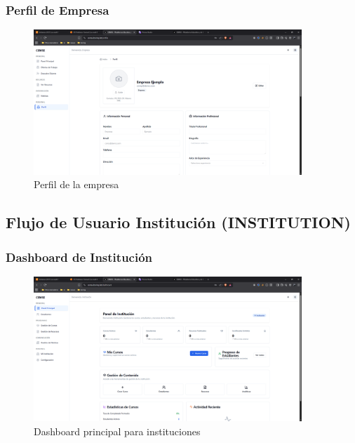 \documentclass[12pt,a4paper]{article}
\begin{document}
\begin{enumerate}
\subsubsection{Perfil de Empresa}
\begin{figure}[H]
    \centering
    \includegraphics[width=0.9\textwidth]{screenshots/companies/profile.png}
    \caption{Perfil de la empresa}
    \label{fig:company-profile}
\end{figure}

\subsection{Flujo de Usuario Institución (INSTITUTION)}

\subsubsection{Dashboard de Institución}
\begin{figure}[H]
    \centering
    \includegraphics[width=0.9\textwidth]{screenshots/institutions/dashboard.png}
    \caption{Dashboard principal para instituciones}
    \label{fig:institution-dashboard}
\end{figure}


\end{enumerate}
\end{document}
